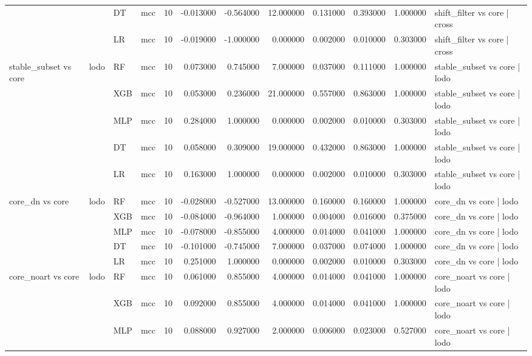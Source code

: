 \begin{tabular}{llllrrrrrrrl}
 &  & DT & mcc & 10 & -0.013000 & -0.564000 & 12.000000 & 0.131000 & 0.393000 & 1.000000 & shift_filter vs core | cross \\
 &  & LR & mcc & 10 & -0.019000 & -1.000000 & 0.000000 & 0.002000 & 0.010000 & 0.303000 & shift_filter vs core | cross \\
\cline{1-12} \cline{2-12}
\multirow[t]{5}{*}{stable_subset vs core} & \multirow[t]{5}{*}{lodo} & RF & mcc & 10 & 0.073000 & 0.745000 & 7.000000 & 0.037000 & 0.111000 & 1.000000 & stable_subset vs core | lodo \\
 &  & XGB & mcc & 10 & 0.053000 & 0.236000 & 21.000000 & 0.557000 & 0.863000 & 1.000000 & stable_subset vs core | lodo \\
 &  & MLP & mcc & 10 & 0.284000 & 1.000000 & 0.000000 & 0.002000 & 0.010000 & 0.303000 & stable_subset vs core | lodo \\
 &  & DT & mcc & 10 & 0.058000 & 0.309000 & 19.000000 & 0.432000 & 0.863000 & 1.000000 & stable_subset vs core | lodo \\
 &  & LR & mcc & 10 & 0.163000 & 1.000000 & 0.000000 & 0.002000 & 0.010000 & 0.303000 & stable_subset vs core | lodo \\
\cline{1-12} \cline{2-12}
\multirow[t]{5}{*}{core_dn vs core} & \multirow[t]{5}{*}{lodo} & RF & mcc & 10 & -0.028000 & -0.527000 & 13.000000 & 0.160000 & 0.160000 & 1.000000 & core_dn vs core | lodo \\
 &  & XGB & mcc & 10 & -0.084000 & -0.964000 & 1.000000 & 0.004000 & 0.016000 & 0.375000 & core_dn vs core | lodo \\
 &  & MLP & mcc & 10 & -0.078000 & -0.855000 & 4.000000 & 0.014000 & 0.041000 & 1.000000 & core_dn vs core | lodo \\
 &  & DT & mcc & 10 & -0.101000 & -0.745000 & 7.000000 & 0.037000 & 0.074000 & 1.000000 & core_dn vs core | lodo \\
 &  & LR & mcc & 10 & 0.251000 & 1.000000 & 0.000000 & 0.002000 & 0.010000 & 0.303000 & core_dn vs core | lodo \\
\cline{1-12} \cline{2-12}
\multirow[t]{5}{*}{core_noart vs core} & \multirow[t]{5}{*}{lodo} & RF & mcc & 10 & 0.061000 & 0.855000 & 4.000000 & 0.014000 & 0.041000 & 1.000000 & core_noart vs core | lodo \\
 &  & XGB & mcc & 10 & 0.092000 & 0.855000 & 4.000000 & 0.014000 & 0.041000 & 1.000000 & core_noart vs core | lodo \\
 &  & MLP & mcc & 10 & 0.088000 & 0.927000 & 2.000000 & 0.006000 & 0.023000 & 0.527000 & core_noart vs core | lodo \\

\end{tabular}
